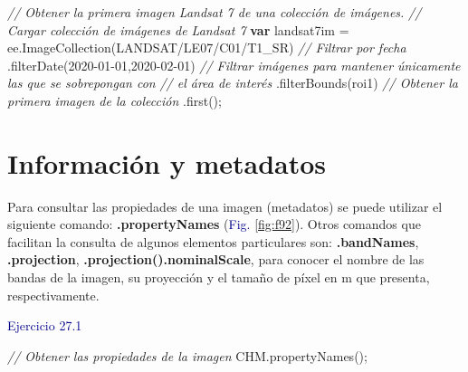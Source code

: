 \documentclass[
  12pt,
  letterpaper,
  twoside]{book}
\newenvironment{Shaded}{\begin{snugshade}}{\end{snugshade}}
\newcommand{\CommentTok}[1]{\textcolor[rgb]{0.24,0.58,0.00}{\textit{#1}}}
\newcommand{\FunctionTok}[1]{\textcolor[rgb]{0.48,0.12,0.64}{#1}}
\newcommand{\KeywordTok}[1]{\textcolor[rgb]{0.00,0.00,0.00}{\textbf{#1}}}
\newcommand{\NormalTok}[1]{#1}
\newcommand{\OperatorTok}[1]{\textcolor[rgb]{0.00,0.00,0.00}{#1}}
\newcommand{\StringTok}[1]{\textcolor[rgb]{0.87,0.29,0.22}{#1}}
\newcommand\boldpurple[1]{\textcolor{darkpurple}{\textbf{#1}}}
\begin{document}
\begin{Shaded}
\begin{Highlighting}[]
\CommentTok{// Obtener la primera imagen Landsat 7 de una colección de imágenes.}
\CommentTok{// Cargar colección de imágenes de Landsat 7          }
\KeywordTok{var}\NormalTok{ landsat7im }\OperatorTok{=}\NormalTok{ ee}\OperatorTok{.}\FunctionTok{ImageCollection}\NormalTok{(}\StringTok{\textquotesingle{}LANDSAT/LE07/C01/T1\_SR\textquotesingle{}}\NormalTok{)}
  \CommentTok{// Filtrar por fecha}
  \OperatorTok{.}\FunctionTok{filterDate}\NormalTok{(}\StringTok{\textquotesingle{}2020{-}01{-}01\textquotesingle{}}\OperatorTok{,}\StringTok{\textquotesingle{}2020{-}02{-}01\textquotesingle{}}\NormalTok{)}
  \CommentTok{// Filtrar imágenes para mantener únicamente las que se sobrepongan con }
  \CommentTok{// el área de interés}
  \OperatorTok{.}\FunctionTok{filterBounds}\NormalTok{(roi1)}
  \CommentTok{// Obtener la primera imagen de la colección}
  \OperatorTok{.}\FunctionTok{first}\NormalTok{()}\OperatorTok{;}
\end{Highlighting}
\end{Shaded}

\hypertarget{informaciuxf3n-y-metadatos-3}{%
\section{Información y metadatos}\label{informaciuxf3n-y-metadatos-3}}

Para consultar las propiedades de una imagen (metadatos) se puede utilizar el siguiente comando: \boldpurple{.propertyNames} (\textcolor{darkblue}{Fig.} \ref{fig:f92}). Otros comandos que facilitan la consulta de algunos elementos particulares son: \boldpurple{.bandNames}, \boldpurple{.projection}, \boldpurple{.projection().nominalScale}, para conocer el nombre de las bandas de la imagen, su proyección y el tamaño de píxel en m que presenta, respectivamente.

\textcolor{darkblue}{Ejercicio 27.1}

\begin{Shaded}
\begin{Highlighting}[]
\CommentTok{// Obtener las propiedades de la imagen}
\NormalTok{CHM}\OperatorTok{.}\FunctionTok{propertyNames}\NormalTok{()}\OperatorTok{;}
\end{Highlighting}
\end{Shaded}
\end{document}
